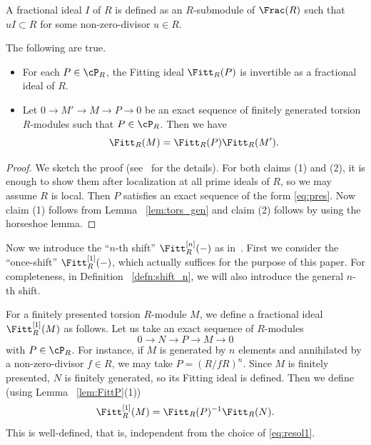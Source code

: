 A fractional ideal $I$ of $R$ is defined as an $R$-submodule of $\Frac(R)$ such that $u I \subset R$ for some non-zero-divisor $u \in R$.

\begin{lemm}\label{lem:FittP}
The following are true.
\begin{itemize}
\item[(1)]
For each $P \in \cP_R$, the Fitting ideal $\Fitt_R(P)$ is invertible as a fractional ideal of $R$.
\item[(2)]
Let $0 \to M' \to M \to P \to 0$ be an exact sequence of finitely generated torsion $R$-modules such that $P \in \cP_R$.
Then we have
\[
\Fitt_R(M) = \Fitt_R(P) \Fitt_R(M').
\]
\end{itemize}
\end{lemm}

\begin{proof}
We sketch the proof (see~\cite[Proposition 2.7]{Kata_05} for the details).
For both claims (1) and (2), it is enough to show them after localization at all prime ideals of $R$, so we may assume $R$ is local.
Then $P$ satisfies an exact sequence of the form \eqref{eq:pres}.
Now claim (1) follows from Lemma ~\ref{lem:tors_gen} and claim (2) follows by using the horseshoe lemma.
\end{proof}

Now we introduce the ``$n$-th shift'' $\Fitt^{[n]}_R(-)$ as in~\cite[Theorem 2.6]{Kata_05}.
First we consider the ``once-shift'' $\Fitt^{[1]}_R(-)$, which actually suffices for the purpose of this paper.
For completeness, in Definition ~\ref{defn:shift_n}, we will also introduce the general $n$-th shift.

\begin{defi}
For a finitely presented torsion $R$-module $M$, we define a fractional ideal $\Fitt^{[1]}_R(M)$ as follows.
Let us take an exact sequence of $R$-modules
\begin{equation}\label{eq:resol1}
0 \to N \to P \to M \to 0
\end{equation}
with $P \in \cP_R$.
For instance, if $M$ is generated by $n$ elements and annihilated by a non-zero-divisor $f \in R$, we may take $P = (R/fR)^n$.
Since $M$ is finitely presented, $N$ is finitely generated, so its Fitting ideal is defined.
Then we define (using Lemma ~\ref{lem:FittP}(1))
\[
\Fitt^{[1]}_R(M) = \Fitt_R(P)^{-1} \Fitt_R(N).
\]
This is well-defined, that is, independent from the choice of \eqref{eq:resol1}.
\end{defi}


